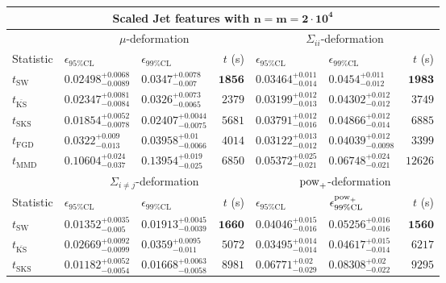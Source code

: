 \begin{tabular}{l|llr|llr}
	\toprule
	\multicolumn{7}{c}{{\bf Scaled Jet features with $\mathbf{n=m=2\cdot 10^{4}}$}} \\
	\toprule
	\multicolumn{1}{c}{} & \multicolumn{3}{c}{$\mu$-deformation} & \multicolumn{3}{c}{$\Sigma_{ii}$-deformation} \\
	Statistic & $\epsilon_{95\%\mathrm{CL}}$ & $\epsilon_{99\%\mathrm    {CL}}$ & $t$ (s) & $\epsilon_{95\%\mathrm{CL}}$ & $\epsilon_{99\%\mathrm{CL}}$ & $t$ (s) \\
	\midrule
	$t_{\mathrm{SW}}$ & $0.02498_{-0.0089}^{+0.0068}$ & $0.0347_{-0.007}^{+0.0078}$ & ${\mathbf{1856}}$ & $0.03464_{-0.014}^{+0.011}$ & $0.0454_{-0.012}^{+0.011}$ & ${\mathbf{1983}}$ \\
	$t_{\overline{\mathrm{KS}}}$ & $0.02347_{-0.0084}^{+0.0081}$ & $0.0326_{-0.0065}^{+0.0073}$ & $2379$ & $0.03199_{-0.013}^{+0.012}$ & $0.04302_{-0.012}^{+0.012}$ & $3749$ \\
	$t_{\mathrm{SKS}}$ & ${\mathbf{0.01854_{-0.0078}^{+0.0052}}}$ & ${\mathbf{0.02407_{-0.0075}^{+0.0044}}}$ & $5681$ & $0.03791_{-0.016}^{+0.012}$ & $0.04866_{-0.014}^{+0.012}$ & $6885$ \\
	$t_{\mathrm{FGD}}$ & $0.0322_{-0.013}^{+0.009}$ & $0.03958_{-0.0066}^{+0.01}$ & $4014$ & ${\mathbf{0.03122_{-0.012}^{+0.013}}}$ & ${\mathbf{0.04039_{-0.0098}^{+0.012}}}$ & $3399$ \\
	$t_{\mathrm{MMD}}$ & $0.10604_{-0.037}^{+0.024}$ & $0.13954_{-0.025}^{+0.019}$ & $6850$ & $0.05372_{-0.021}^{+0.025}$ & $0.06748_{-0.021}^{+0.024}$ & $12626$ \\
	\toprule
	\multicolumn{1}{c}{} & \multicolumn{3}{c}{$\Sigma_{i\neq j}$-deformation} & \multicolumn{3}{c}{$\rm{pow}_{+}$-deformation} \\
	Statistic & $\epsilon_{95\%\mathrm{CL}}$ & $\epsilon_{99\%\mathrm{CL}}$ & $t$ (s) & $\epsilon_{95\%\mathrm{CL}}$ & $\epsilon^{\rm   {pow}_{+}}_{99\%\mathrm{CL}}$ & $t$ (s) \\
	\midrule
	$t_{\mathrm{SW}}$ & $0.01352_{-0.005}^{+0.0035}$ & $0.01913_{-0.0039}^{+0.0045}$ & ${\mathbf{1660}}$ & $0.04046_{-0.016}^{+0.015}$ & $0.05256_{-0.016}^{+0.016}$ & ${\mathbf{1560}}$ \\
	$t_{\overline{\mathrm{KS}}}$ & $0.02669_{-0.0099}^{+0.0092}$ & $0.0359_{-0.011}^{+0.0095}$ & $5072$ & $0.03495_{-0.014}^{+0.014}$ & $0.04617_{-0.014}^{+0.015}$ & $6217$ \\
	$t_{\mathrm{SKS}}$ & $0.01182_{-0.0054}^{+0.0052}$ & $0.01668_{-0.0058}^{+0.0063}$ & $8981$ & $0.06771_{-0.029}^{+0.02}$ & $0.08308_{-0.022}^{+0.02}$ & $9295$ \\

\end{tabular}
